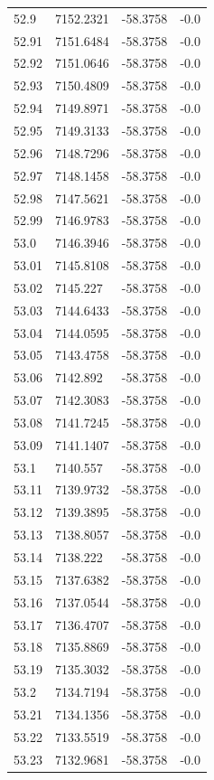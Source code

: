 \begin{table}[H]
\begin{tabular}{llll}
52.9 & 7152.2321 & -58.3758 & -0.0 \\
52.91 & 7151.6484 & -58.3758 & -0.0 \\
52.92 & 7151.0646 & -58.3758 & -0.0 \\
52.93 & 7150.4809 & -58.3758 & -0.0 \\
52.94 & 7149.8971 & -58.3758 & -0.0 \\
52.95 & 7149.3133 & -58.3758 & -0.0 \\
52.96 & 7148.7296 & -58.3758 & -0.0 \\
52.97 & 7148.1458 & -58.3758 & -0.0 \\
52.98 & 7147.5621 & -58.3758 & -0.0 \\
52.99 & 7146.9783 & -58.3758 & -0.0 \\
53.0 & 7146.3946 & -58.3758 & -0.0 \\
53.01 & 7145.8108 & -58.3758 & -0.0 \\
53.02 & 7145.227 & -58.3758 & -0.0 \\
53.03 & 7144.6433 & -58.3758 & -0.0 \\
53.04 & 7144.0595 & -58.3758 & -0.0 \\
53.05 & 7143.4758 & -58.3758 & -0.0 \\
53.06 & 7142.892 & -58.3758 & -0.0 \\
53.07 & 7142.3083 & -58.3758 & -0.0 \\
53.08 & 7141.7245 & -58.3758 & -0.0 \\
53.09 & 7141.1407 & -58.3758 & -0.0 \\
53.1 & 7140.557 & -58.3758 & -0.0 \\
53.11 & 7139.9732 & -58.3758 & -0.0 \\
53.12 & 7139.3895 & -58.3758 & -0.0 \\
53.13 & 7138.8057 & -58.3758 & -0.0 \\
53.14 & 7138.222 & -58.3758 & -0.0 \\
53.15 & 7137.6382 & -58.3758 & -0.0 \\
53.16 & 7137.0544 & -58.3758 & -0.0 \\
53.17 & 7136.4707 & -58.3758 & -0.0 \\
53.18 & 7135.8869 & -58.3758 & -0.0 \\
53.19 & 7135.3032 & -58.3758 & -0.0 \\
53.2 & 7134.7194 & -58.3758 & -0.0 \\
53.21 & 7134.1356 & -58.3758 & -0.0 \\
53.22 & 7133.5519 & -58.3758 & -0.0 \\
53.23 & 7132.9681 & -58.3758 & -0.0 \\

\end{tabular}
\end{table}

